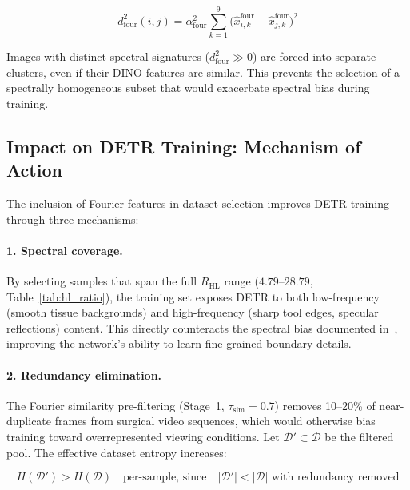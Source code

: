 \begin{equation}
    d_{\text{four}}^2(i,j) = \alpha_{\text{four}}^2
    \sum_{k=1}^{9} \bigl(\hat{x}_{i,k}^{\text{four}}
                        - \hat{x}_{j,k}^{\text{four}}\bigr)^2
\end{equation}

Images with distinct spectral signatures ($d_{\text{four}}^2 \gg 0$)
are forced into separate clusters, even if their DINO features are similar.
This prevents the selection of a spectrally homogeneous subset that would
exacerbate spectral bias during training.


\subsection{Impact on DETR Training: Mechanism of Action}
\label{sec:training_impact}

The inclusion of Fourier features in dataset selection improves DETR training
through three mechanisms:

\paragraph{1. Spectral coverage.}
By selecting samples that span the full $R_{\text{HL}}$ range
($4.79$--$28.79$, Table~\ref{tab:hl_ratio}), the training set exposes DETR to
both low-frequency (smooth tissue backgrounds) and high-frequency (sharp tool
edges, specular reflections) content.  This directly counteracts the spectral
bias documented in~\cite{rahaman2019spectral}, improving the network's ability
to learn fine-grained boundary details.

\paragraph{2. Redundancy elimination.}
The Fourier similarity pre-filtering (Stage~1, $\tau_{\text{sim}} = 0.7$)
removes 10--20\% of near-duplicate frames from surgical video sequences, which
would otherwise bias training toward overrepresented viewing conditions.  Let
$\mathcal{D}' \subset \mathcal{D}$ be the filtered pool.  The effective
dataset entropy increases:

\begin{equation}
    H(\mathcal{D}') > H(\mathcal{D})
    \quad \text{per-sample, since}
    \quad |\mathcal{D}'| < |\mathcal{D}|
    \text{ with redundancy removed}
\end{equation}

